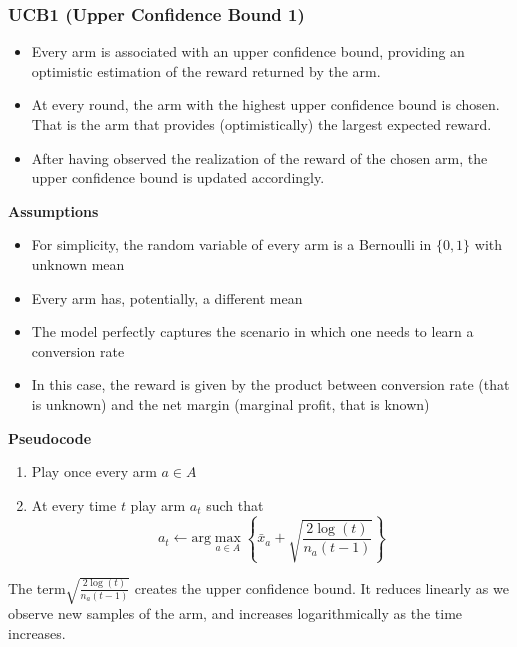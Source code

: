 \documentclass[10pt,a4paper]{article}
\begin{document}
\subsubsection{UCB1 (Upper Confidence Bound
1)}\label{ucb1-upper-confidence-bound-1}

\begin{itemize}
\item Every arm is associated with an upper confidence bound, providing an optimistic estimation of the reward returned by the arm.
\item At every round, the arm with the highest upper confidence bound is chosen. That is the arm that provides (optimistically) the largest expected reward.
\item After having observed the realization of the reward of the chosen arm, the upper confidence bound is updated accordingly.
\end{itemize}

\textbf{Assumptions}

\begin{itemize}

\item For simplicity, the random variable of every arm is a Bernoulli in $\{0, 1\}$ with unknown mean
\item Every arm has, potentially, a different mean
\item The model perfectly captures the scenario in which one needs to learn a conversion rate
\item In this case, the reward is given by the product between conversion rate (that is unknown) and the net margin (marginal profit, that is known)
\end{itemize}

\textbf{Pseudocode}
\begin{shaded}
\begin{enumerate}
\item Play once every arm $a \in A$
\item At every time $t$ play arm $a_t$ such that
$$a_t \leftarrow \text{arg} \max_{a \in A}{\left\{ \bar{x}_a + \sqrt{\frac{2 \log(t)}{n_a (t-1)}} \right\}}$$
\end{enumerate}
\end{shaded}

The term$\sqrt{\frac{2 \log(t)}{n_a (t-1)}}$ creates the upper confidence bound. It reduces linearly as we observe new samples of the arm, and increases logarithmically as the time increases.
\newline
\end{document}
